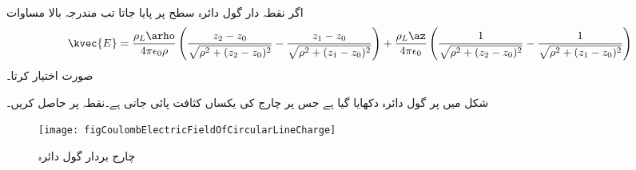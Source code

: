 اگر نقطہ دار گول دائرہ  سطح پر پایا جاتا تب مندرجہ بالا مساوات 
\begin{align*}
\kvec{E}=\frac{\rho_L \arho}{4\pi\epsilon_0 \rho} \left(\frac{z_2-z_0}{\sqrt{\rho^2+(z_2-z_0)^2}}-\frac{z_1-z_0}{\sqrt{\rho^2+(z_1-z_0)^2}}\right)+\frac{\rho_L \az}{4\pi\epsilon_0 } \left(\frac{1}{\sqrt{\rho^2+(z_2-z_0)^2}}-\frac{1}{\sqrt{\rho^2+(z_1-z_0)^2}} \right)
\end{align*}
صورت اختیار کرتا۔

شکل  میں  پر گول دائرہ دکھایا گیا ہے جس پر چارج کی یکساں کثافت پائی جاتی ہے۔نقطہ  پر  حاصل کریں۔

\begin{figure}
\centering
\texttt{[image: figCoulombElectricFieldOfCircularLineCharge]}
\caption{چارج بردار گول دائرہ}
\label{شکل_کولومب_گول_دائرے_پر_چارج}
\end{figure}

